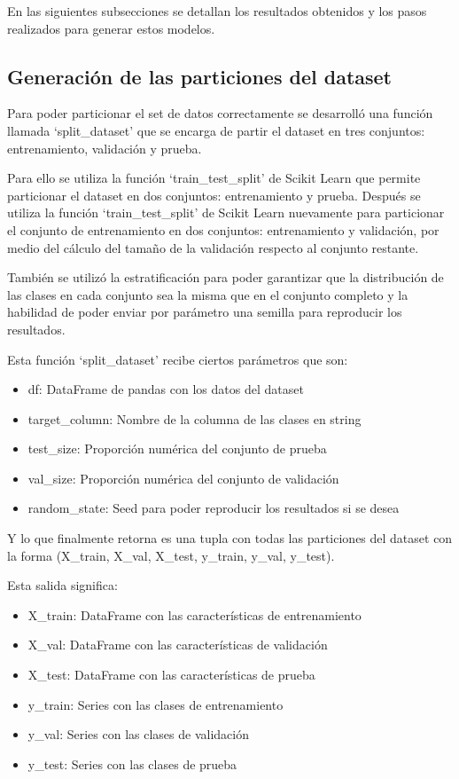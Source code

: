 \documentclass[12pt,a4paper]{article}
\begin{document}
En las siguientes subsecciones se detallan los resultados obtenidos y los pasos realizados
para generar estos modelos.

\subsection{Generación de las particiones del dataset}

Para poder particionar el set de datos correctamente se desarrolló una función llamada
`split_dataset' que se encarga de partir el dataset en tres conjuntos: entrenamiento,
validación y prueba.

Para ello se utiliza la función `train_test_split' de Scikit Learn que permite particionar el dataset
en dos conjuntos: entrenamiento y prueba.
Después se utiliza la función `train_test_split' de Scikit Learn nuevamente para particionar el conjunto de entrenamiento
en dos conjuntos: entrenamiento y validación, por medio del cálculo del tamaño de la validación
respecto al conjunto restante.

También se utilizó la estratificación para poder garantizar que la distribución de las clases
en cada conjunto sea la misma que en el conjunto completo y la habilidad de poder
enviar por parámetro una semilla para reproducir los resultados.

Esta función `split_dataset' recibe ciertos parámetros que son:
\begin{itemize}
  \item df: DataFrame de pandas con los datos del dataset
  \item target_column: Nombre de la columna de las clases en string
  \item test_size: Proporción numérica del conjunto de prueba
  \item val_size: Proporción numérica del conjunto de validación
  \item random_state: Seed para poder reproducir los resultados si se desea
\end{itemize}

Y lo que finalmente retorna es una tupla con todas las particiones del dataset con la
forma (X_train, X_val, X_test, y_train, y_val, y_test).

Esta salida significa:

\begin{itemize}
  \item X_train: DataFrame con las características de entrenamiento
  \item X_val: DataFrame con las características de validación
  \item X_test: DataFrame con las características de prueba
  \item y_train: Series con las clases de entrenamiento
  \item y_val: Series con las clases de validación
  \item y_test: Series con las clases de prueba
\end{itemize}
\end{document}
